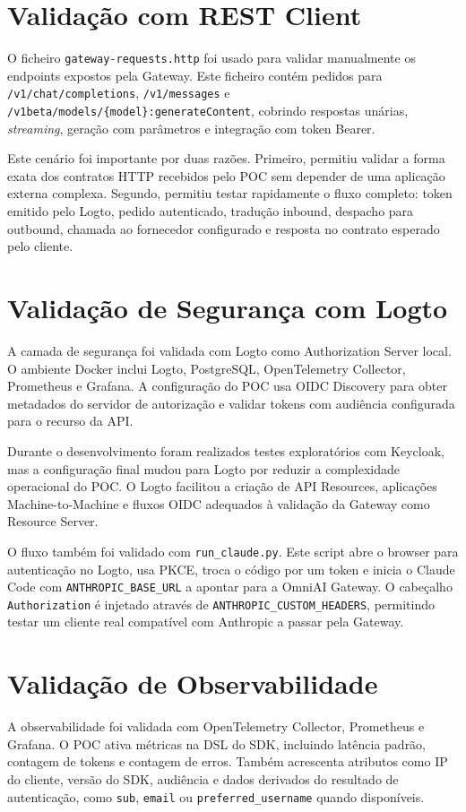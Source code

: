 \documentclass[11pt,a4paper]{report}
\begin{document}
    \section{Validação com REST Client}
    O ficheiro \texttt{gateway-requests.http} foi usado para validar manualmente os endpoints expostos pela Gateway. Este ficheiro contém pedidos para \texttt{/v1/chat/completions}, \texttt{/v1/messages} e \texttt{/v1beta/models/\{model\}:generateContent}, cobrindo respostas unárias, \textit{streaming}, geração com parâmetros e integração com token Bearer.

    Este cenário foi importante por duas razões. Primeiro, permitiu validar a forma exata dos contratos HTTP recebidos pelo POC sem depender de uma aplicação externa complexa. Segundo, permitiu testar rapidamente o fluxo completo: token emitido pelo Logto, pedido autenticado, tradução inbound, despacho para outbound, chamada ao fornecedor configurado e resposta no contrato esperado pelo cliente.

    \section{Validação de Segurança com Logto}
    A camada de segurança foi validada com Logto como Authorization Server local. O ambiente Docker inclui Logto, PostgreSQL, OpenTelemetry Collector, Prometheus e Grafana. A configuração do POC usa OIDC Discovery para obter metadados do servidor de autorização e validar tokens com audiência configurada para o recurso da API.

    Durante o desenvolvimento foram realizados testes exploratórios com Keycloak, mas a configuração final mudou para Logto por reduzir a complexidade operacional do POC. O Logto facilitou a criação de API Resources, aplicações Machine-to-Machine e fluxos OIDC adequados à validação da Gateway como Resource Server.

    O fluxo também foi validado com \texttt{run\_claude.py}. Este script abre o browser para autenticação no Logto, usa PKCE, troca o código por um token e inicia o Claude Code com \texttt{ANTHROPIC\_BASE\_URL} a apontar para a OmniAI Gateway. O cabeçalho \texttt{Authorization} é injetado através de \texttt{ANTHROPIC\_CUSTOM\_HEADERS}, permitindo testar um cliente real compatível com Anthropic a passar pela Gateway.

    \section{Validação de Observabilidade}
    A observabilidade foi validada com OpenTelemetry Collector, Prometheus e Grafana. O POC ativa métricas na DSL do SDK, incluindo latência padrão, contagem de tokens e contagem de erros. Também acrescenta atributos como IP do cliente, versão do SDK, audiência e dados derivados do resultado de autenticação, como \texttt{sub}, \texttt{email} ou \texttt{preferred\_username} quando disponíveis.
\end{document}

